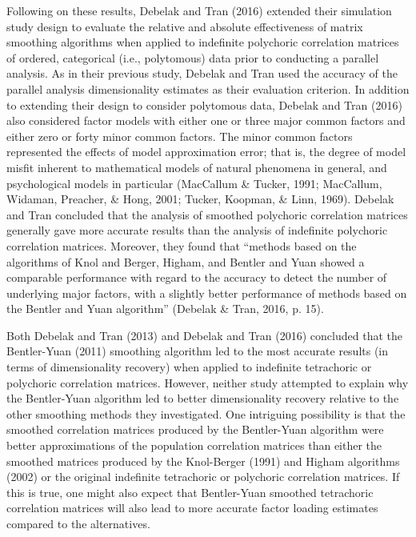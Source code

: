 \documentclass[
  english,
  man]{apa6}
\begin{document}
Following on these results, Debelak and Tran (2016) extended their simulation study design to evaluate the relative and absolute effectiveness of matrix smoothing algorithms when applied to indefinite polychoric correlation matrices of ordered, categorical (i.e., polytomous) data prior to conducting a parallel analysis. As in their previous study, Debelak and Tran used the accuracy of the parallel analysis dimensionality estimates as their evaluation criterion. In addition to extending their design to consider polytomous data, Debelak and Tran (2016) also considered factor models with either one or three major common factors and either zero or forty minor common factors. The minor common factors represented the effects of model approximation error; that is, the degree of model misfit inherent to mathematical models of natural phenomena in general, and psychological models in particular (MacCallum \& Tucker, 1991; MacCallum, Widaman, Preacher, \& Hong, 2001; Tucker, Koopman, \& Linn, 1969). Debelak and Tran concluded that the analysis of smoothed polychoric correlation matrices generally gave more accurate results than the analysis of indefinite polychoric correlation matrices. Moreover, they found that \enquote{methods based on the algorithms of Knol and Berger, Higham, and Bentler and Yuan showed a comparable performance with regard to the accuracy to detect the number of underlying major factors, with a slightly better performance of methods based on the Bentler and Yuan algorithm} (Debelak \& Tran, 2016, p. 15).

Both Debelak and Tran (2013) and Debelak and Tran (2016) concluded that the Bentler-Yuan (2011) smoothing algorithm led to the most accurate results (in terms of dimensionality recovery) when applied to indefinite tetrachoric or polychoric correlation matrices. However, neither study attempted to explain why the Bentler-Yuan algorithm led to better dimensionality recovery relative to the other smoothing methods they investigated. One intriguing possibility is that the smoothed correlation matrices produced by the Bentler-Yuan algorithm were better approximations of the population correlation matrices than either the smoothed matrices produced by the Knol-Berger (1991) and Higham algorithms (2002) or the original indefinite tetrachoric or polychoric correlation matrices. If this is true, one might also expect that Bentler-Yuan smoothed tetrachoric correlation matrices will also lead to more accurate factor loading estimates compared to the alternatives.
\end{document}
